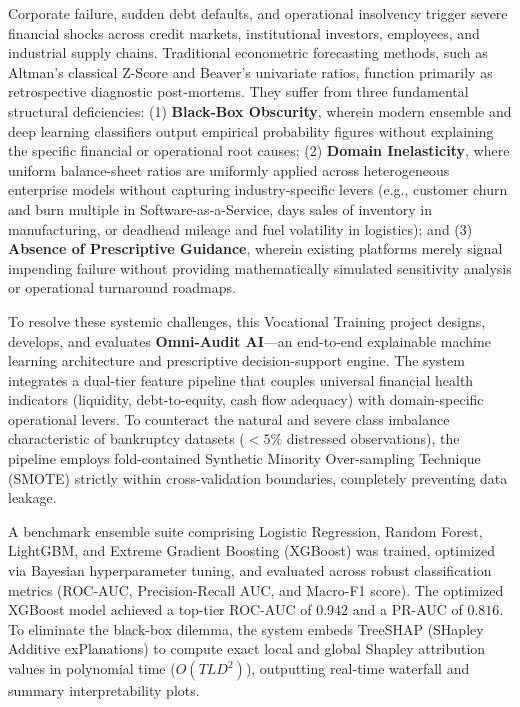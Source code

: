 \documentclass[11pt, a4paper]{article}
\begin{document}
Corporate failure, sudden debt defaults, and operational insolvency trigger severe financial shocks across credit markets, institutional investors, employees, and industrial supply chains. Traditional econometric forecasting methods, such as Altman's classical Z-Score and Beaver's univariate ratios, function primarily as retrospective diagnostic post-mortems. They suffer from three fundamental structural deficiencies: (1) \textbf{Black-Box Obscurity}, wherein modern ensemble and deep learning classifiers output empirical probability figures without explaining the specific financial or operational root causes; (2) \textbf{Domain Inelasticity}, where uniform balance-sheet ratios are uniformly applied across heterogeneous enterprise models without capturing industry-specific levers (e.g., customer churn and burn multiple in Software-as-a-Service, days sales of inventory in manufacturing, or deadhead mileage and fuel volatility in logistics); and (3) \textbf{Absence of Prescriptive Guidance}, wherein existing platforms merely signal impending failure without providing mathematically simulated sensitivity analysis or operational turnaround roadmaps.

To resolve these systemic challenges, this Vocational Training project designs, develops, and evaluates \textbf{Omni-Audit AI}---an end-to-end explainable machine learning architecture and prescriptive decision-support engine. The system integrates a dual-tier feature pipeline that couples universal financial health indicators (liquidity, debt-to-equity, cash flow adequacy) with domain-specific operational levers. To counteract the natural and severe class imbalance characteristic of bankruptcy datasets ($< 5\%$ distressed observations), the pipeline employs fold-contained Synthetic Minority Over-sampling Technique (SMOTE) strictly within cross-validation boundaries, completely preventing data leakage. 

A benchmark ensemble suite comprising Logistic Regression, Random Forest, LightGBM, and Extreme Gradient Boosting (XGBoost) was trained, optimized via Bayesian hyperparameter tuning, and evaluated across robust classification metrics (ROC-AUC, Precision-Recall AUC, and Macro-F1 score). The optimized XGBoost model achieved a top-tier ROC-AUC of $0.942$ and a PR-AUC of $0.816$. To eliminate the black-box dilemma, the system embeds TreeSHAP (SHapley Additive exPlanations) to compute exact local and global Shapley attribution values in polynomial time ($O(TLD^2)$), outputting real-time waterfall and summary interpretability plots. 
\end{document}
